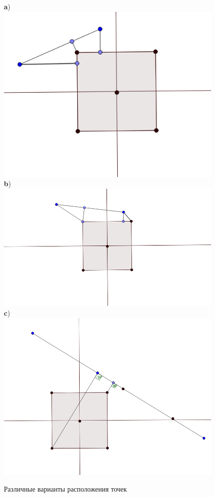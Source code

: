 \begin{figure}[ht!]
\begin{center}
\textbf{a})\includegraphics[scale=0.3]{images/conv_case1}
\vspace*{+10mm}
\textbf{b})\includegraphics[scale=0.27]{images/conv_case2}
\textbf{c})\includegraphics[scale=0.26]{images/conv_case3}
\end{center}
\vspace*{-8mm}
\caption{Различные варианты расположения точек}\label{fig:conv_case}
\end{figure}

